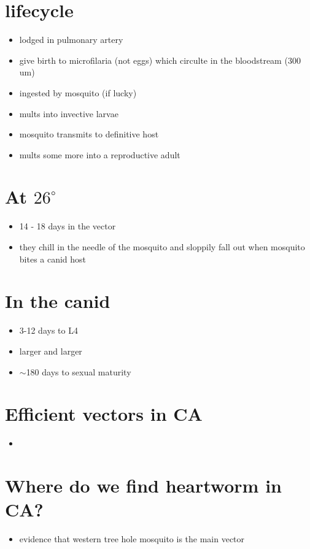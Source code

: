 \documentclass{article}
\begin{document}
    \section{lifecycle}
        \begin{itemize}
            \item lodged in pulmonary artery
            \item give birth to microfilaria (not eggs) which circulte in the bloodstream (300 um)
            \item ingested by mosquito (if lucky)
            \item mults into invective larvae
            \item mosquito transmits to definitive host
            \item mults some more into a reproductive adult
        \end{itemize}

    \section{At $26^\circ$}
        \begin{itemize}
            \item 14 - 18 days in the vector
            \item they chill in the needle of the mosquito and sloppily fall out when mosquito bites a canid host
        \end{itemize}

    \section{In the canid}
        \begin{itemize}
            \item 3-12 days to L4
            \item larger and larger
            \item $\sim$180 days to sexual maturity
        \end{itemize}

    \section{Efficient vectors in CA}
        \begin{itemize}
            \item 
        \end{itemize}

    \section{Where do we find heartworm in CA?}
        \begin{itemize}
            \item evidence that western tree hole mosquito is the main vector
        \end{itemize}
\end{document}
